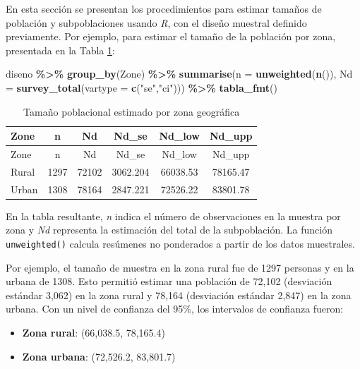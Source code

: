\documentclass[
  spanish,
  12pt,
]{book}
\newenvironment{Shaded}{\begin{snugshade}}{\end{snugshade}}
\newcommand{\AttributeTok}[1]{\textcolor[rgb]{0.13,0.29,0.53}{#1}}
\newcommand{\FunctionTok}[1]{\textcolor[rgb]{0.13,0.29,0.53}{\textbf{#1}}}
\newcommand{\NormalTok}[1]{#1}
\newcommand{\SpecialCharTok}[1]{\textcolor[rgb]{0.81,0.36,0.00}{\textbf{#1}}}
\newcommand{\StringTok}[1]{\textcolor[rgb]{0.31,0.60,0.02}{#1}}
\providecommand{\tightlist}{%
  \setlength{\itemsep}{0pt}\setlength{\parskip}{0pt}}
\begin{document}
En esta sección se presentan los procedimientos para estimar tamaños de población y subpoblaciones usando \emph{R}, con el diseño muestral definido previamente. Por ejemplo, para estimar el tamaño de la población por zona, presentada en la Tabla \ref{tab:tab-tamano-zona}:

\begin{Shaded}
\begin{Highlighting}[]
\NormalTok{diseno }\SpecialCharTok{\%\textgreater{}\%} 
     \FunctionTok{group\_by}\NormalTok{(Zone) }\SpecialCharTok{\%\textgreater{}\%} 
     \FunctionTok{summarise}\NormalTok{(}\AttributeTok{n =} \FunctionTok{unweighted}\NormalTok{(}\FunctionTok{n}\NormalTok{()), }
               \AttributeTok{Nd =} \FunctionTok{survey\_total}\NormalTok{(}\AttributeTok{vartype =} \FunctionTok{c}\NormalTok{(}\StringTok{"se"}\NormalTok{,}\StringTok{"ci"}\NormalTok{))) }\SpecialCharTok{\%\textgreater{}\%}
  \FunctionTok{tabla\_fmt}\NormalTok{()}
\end{Highlighting}
\end{Shaded}

\begin{longtable}[]{@{}lccccc@{}}
\caption{\label{tab:tab-tamano-zona}Tamaño poblacional estimado por zona geográfica}\tabularnewline
\toprule\noalign{}
Zone & n & Nd & Nd\_se & Nd\_low & Nd\_upp \\
\midrule\noalign{}
\endfirsthead
\toprule\noalign{}
Zone & n & Nd & Nd\_se & Nd\_low & Nd\_upp \\
\midrule\noalign{}
\endhead
\bottomrule\noalign{}
\endlastfoot
Rural & 1297 & 72102 & 3062.204 & 66038.53 & 78165.47 \\
Urban & 1308 & 78164 & 2847.221 & 72526.22 & 83801.78 \\
\end{longtable}

En la tabla resultante, \emph{n} indica el número de observaciones en la muestra por zona y \emph{Nd} representa la estimación del total de la subpoblación. La función \texttt{unweighted()} calcula resúmenes no ponderados a partir de los datos muestrales.

Por ejemplo, el tamaño de muestra en la zona rural fue de 1297 personas y en la urbana de 1308. Esto permitió estimar una población de 72,102 (desviación estándar 3,062) en la zona rural y 78,164 (desviación estándar 2,847) en la zona urbana. Con un nivel de confianza del 95\%, los intervalos de confianza fueron:

\begin{itemize}
\tightlist
\item
  \textbf{Zona rural}: (66,038.5, 78,165.4)
\item
  \textbf{Zona urbana}: (72,526.2, 83,801.7)
\end{itemize}
\end{document}
